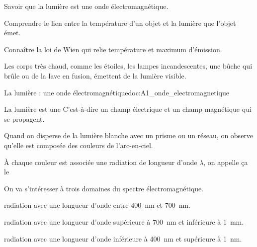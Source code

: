 \tetePremStssLumi



\begin{objectifs}
  \item Savoir que la lumière est une onde électromagnétique.
  \item Comprendre le lien entre la température d'un objet et la lumière que l'objet émet.
  \item Connaître la loi de Wien qui relie température et maximum d'émission.
\end{objectifs}

\begin{contexte}
  Les corps très chaud, comme les étoiles, les lampes incandescentes, une bûche qui brûle ou de la lave en fusion, émettent de la lumière visible.
  
\end{contexte}


\begin{doc}{La lumière : une onde électromagnétique}{doc:A1_onde_electromagnetique}
  \begin{importants}
    La lumière est une 
    C'est-à-dire un champ électrique et un champ magnétique qui se propagent.
  \end{importants}

  Quand on disperse de la lumière blanche avec un prisme ou un réseau, on observe qu'elle est composée des couleurs de l'arc-en-ciel.
  \begin{center}
  \end{center}
  \begin{center}
  \end{center}

  À chaque couleur est associée une radiation de longueur d'onde $\lambda$, on appelle ça le 

  \begin{importants}    
    On va s'intéresser à trois domaines du spectre électromagnétique.
    \begin{listePoints}
      \item {} radiation avec une longueur d'onde entre \qty{400}{\nm} et \qty{700}{\nm}.
      \item {} radiation avec une longueur d'onde supérieure à \qty{700}{\nm} et inférieure à \qty{1}{\mm}.
      \item {} radiation avec une longueur d'onde inférieure à \qty{400}{\nm} et supérieure à \qty{1}{\nm}.
    \end{listePoints}
  \end{importants}
\end{doc}

